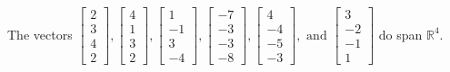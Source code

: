 \begin{exercise}
\begin{exerciseStatement}
  \end{exerciseStatement}
  \begin{exerciseAnswer}
   The vectors \(\left[\begin{array}{r}
2 \\
3 \\
4 \\
2
\end{array}\right] , \left[\begin{array}{r}
4 \\
1 \\
3 \\
2
\end{array}\right] , \left[\begin{array}{r}
1 \\
-1 \\
3 \\
-4
\end{array}\right] , \left[\begin{array}{r}
-7 \\
-3 \\
-3 \\
-8
\end{array}\right] , \left[\begin{array}{r}
4 \\
-4 \\
-5 \\
-3
\end{array}\right] , \text{ and } \left[\begin{array}{r}
3 \\
-2 \\
-1 \\
1
\end{array}\right]\) 
  	 do  
	span \(\mathbb{R}^4\).
  


  \end{exerciseAnswer}
\end{exercise}